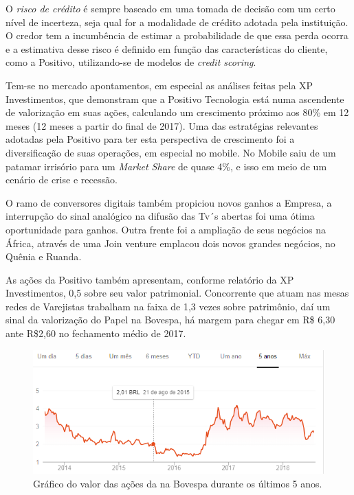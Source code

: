 O \emph{risco de crédito} é sempre baseado em uma tomada de decisão com um certo nível de incerteza, seja qual for a modalidade de crédito adotada pela instituição\cite{sicsu2010}. O credor tem a incumbência de estimar a probabilidade de que essa  perda ocorra
e a estimativa desse risco é definido em função das características do cliente, como a Positivo, utilizando-se de modelos de \emph{credit scoring}.

Tem-se no mercado apontamentos, em especial as análises feitas pela XP Investimentos\cite{xpinvest2017}, que demonstram que a Positivo Tecnologia está numa ascendente de valorização em suas ações, calculando um crescimento próximo aos 80\% em 12 meses (12 meses a partir do final de 2017). Uma das estratégias relevantes adotadas pela Positivo para ter esta perspectiva de crescimento foi a diversificação de suas operações, em especial no mobile. No Mobile saiu de um patamar irrisório para um \emph{Market Share} de quase 4\%, e isso em meio de um cenário de crise e recessão.

O ramo de conversores digitais também propiciou novos ganhos a Empresa, a interrupção do sinal analógico na difusão das Tv´s abertas foi uma ótima oportunidade para ganhos. Outra frente foi a ampliação de seus negócios na África, através de uma Join venture emplacou dois novos grandes negócios, no Quênia e Ruanda\cite{jointVentureBgh2010}.

As ações da Positivo também apresentam, conforme relatório da XP Investimentos, 0,5 sobre seu valor patrimonial. Concorrente que atuam nas mesas redes de Varejistas trabalham na faixa de 1,3 vezes sobre patrimônio, daí um sinal da valorização do Papel na Bovespa, há margem para chegar em R\$ 6,30 ante R\$2,60 no fechamento médio de 2017.

\begin{figure}[h]
\begin{centering}
\includegraphics[width=1.0\textwidth]{Img/PositivoBovespa}
\caption{Gráfico do valor das ações da \nomeCompletoPositivo{} na Bovespa durante os últimos 5 anos\cite{googleFinancas2018}.}
\par\end{centering}
\end{figure}

